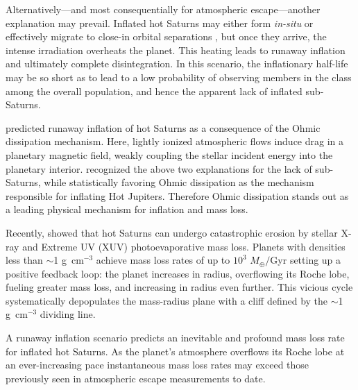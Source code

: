 \documentclass[twocolumn]{aastex631}
\begin{document}
Alternatively---and most consequentially for atmospheric escape---another explanation may prevail.  Inflated hot Saturns may either form \emph{in-situ} or effectively migrate to close-in orbital separations \citep{2018ARA&A..56..175D}, but once they arrive, the intense irradiation overheats the planet.  This heating leads to runaway inflation and ultimately complete disintegration.  In this scenario, the inflationary half-life may be so short as to lead to a low probability of observing members in the class among the overall population, and hence the apparent lack of inflated sub-Saturns.

\citet{2011ApJ...738....1B} predicted runaway inflation of hot Saturns as a consequence of the Ohmic dissipation mechanism.  Here, lightly ionized atmospheric flows induce drag in a planetary magnetic field, weakly coupling the stellar incident energy into the planetary interior.  \citet{2018AJ....155..214T} recognized the above two explanations for the lack of sub-Saturns, while statistically favoring Ohmic dissipation as the mechanism responsible for inflating Hot Jupiters.  Therefore Ohmic dissipation stands out as a leading physical mechanism for inflation and mass loss.

Recently, \citet{2023ApJ...945L..36T} showed that hot Saturns can undergo catastrophic erosion by stellar X-ray and Extreme UV (XUV) photoevaporative mass loss. Planets with densities less than $\sim$1 g~cm$^{-3}$ achieve mass loss rates of up to $10^3$ $M_\oplus /$Gyr setting up a positive feedback loop: the planet increases in radius, overflowing its Roche lobe, fueling greater mass loss, and increasing in radius even further.  This vicious cycle systematically depopulates the mass-radius plane with a cliff defined by the $\sim$1 g~cm$^{-3}$ dividing line.

A runaway inflation scenario predicts an inevitable and profound mass loss rate for inflated hot Saturns.  As the planet's atmosphere overflows its Roche lobe at an ever-increasing pace instantaneous mass loss rates may exceed those previously seen in atmospheric escape measurements to date.
\end{document}
